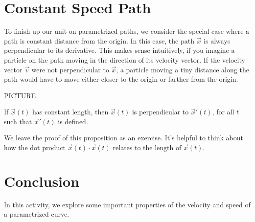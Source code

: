 \documentclass{ximera}
\begin{document}
\section{Constant Speed Path}

To finish up our unit on parametrized paths, we consider the special case where a path is constant distance from the origin. In this case, the path $\vec{x}$ is always perpendicular to its derivative. This makes sense intuitively, if you imagine a particle on the path moving in the direction of its velocity vector. If the velocity vector $\vec{v}$ were not perpendicular to $\vec{x}$, a particle moving a tiny distance along the path would have to move either closer to the origin or farther from the origin.

PICTURE

\begin{proposition}
If $\vec{x}(t)$ has constant length, then $\vec{x}(t)$ is perpendicular to $\vec{x}'(t)$, for all $t$ such that $\vec{x}'(t)$ is defined.
\end{proposition}

We leave the proof of this proposition as an exercise. It's helpful to think about how the dot product $\vec{x}(t)\cdot\vec{x}(t)$ relates to the length of $\vec{x}(t)$.



\section{Conclusion}

In this activity, we explore some important properties of the velocity and speed of a parametrized curve.
\end{document}
